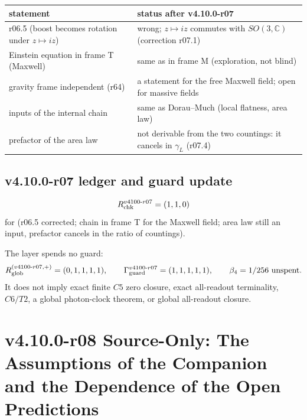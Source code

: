 \begin{center}
\small
\begin{tabular}{@{}>{\raggedright\arraybackslash}p{}>{\raggedright\arraybackslash}p{}@{}}
\toprule
statement & status after v4.10.0-r07\\
\midrule
r06.5 (boost becomes rotation under \(z\mapsto iz\)) & wrong; \(z\mapsto iz\) commutes with \(SO(3,\mathbb C)\) (correction r07.1)\\
Einstein equation in frame T (Maxwell) & same as in frame M (exploration, not blind)\\
gravity frame independent (r64) & a statement for the free Maxwell field; open for massive fields\\
inputs of the internal chain & same as Dorau--Much (local flatness, area law)\\
prefactor of the area law & not derivable from the two countings: it cancels in \(\gamma_L\) (r07.4)\\
\bottomrule
\end{tabular}
\end{center}

\subsection*{v4.10.0-r07 ledger and guard update}
\label{subsec:v4100-r07-ledger-guard}

\[
R_{\rm chk}^{v4100\text{-}r07}=(1,1,0)
\]
for (r06.5 corrected; chain in frame T for the Maxwell field; area law still an input, prefactor cancels in the ratio of countings).

The layer spends no guard:
\[
R_{\rm glob}^{(v4100\text{-}r07,+)}=(0,1,1,1,1),
\qquad
\Gamma_{\rm guard}^{v4100\text{-}r07}=(1,1,1,1,1),
\qquad
\beta_4=1/256\ \text{unspent}.
\]
It does not imply exact finite \(C5\) zero closure, exact all-readout terminality,
\(C6/T2\), a global photon-clock theorem, or global all-readout closure.
\clearpage
\section*{v4.10.0-r08 Source-Only: The Assumptions of the Companion and the Dependence of the Open Predictions}
\label{sec:v4100-r08-assumptions}

